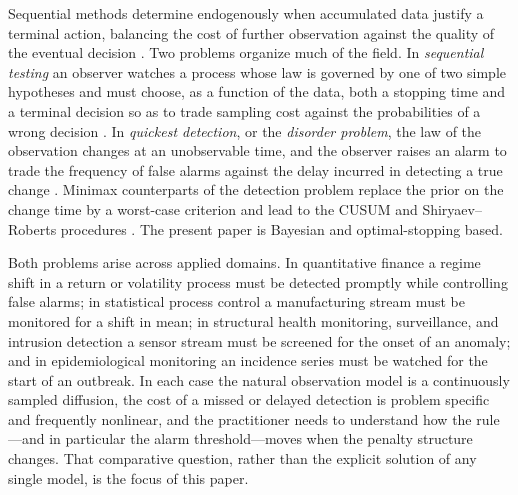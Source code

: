 \documentclass[pdflatex,sn-mathphys-num]{sn-jnl}
\theoremstyle{plain}
\theoremstyle{definition}
\begin{document}
Sequential methods determine endogenously when accumulated data justify a terminal action, balancing the cost of further observation against the quality of the eventual decision \citep{wald2004sequential,wald1948optimum,rincon2025sequential,wang2025analysis,chow1971great,griffith2021statistics,silva2020optimal,silva2015continuous,wang2025analysis1,fischer2026improving}.
Two problems organize much of the field. In \emph{sequential testing} an observer
watches a process whose law is governed by one of two simple hypotheses and must
choose, as a function of the data, both a stopping time and a terminal decision so
as to trade sampling cost against the probabilities of a wrong decision \cite{shiryaev2025optimal,pabbaraju2026simple,liu2025bidirectional}. In
\emph{quickest detection}, or the \emph{disorder problem}, the law of the
observation changes at an unobservable time, and the observer raises an alarm to
trade the frequency of false alarms against the delay incurred in detecting a true
change \citep{shiryaev1963optimum,naha2023quickest,snow2024quickest,sha2025quickest,liang2025global}. Minimax counterparts of the detection
problem replace the prior on the change time by a worst-case criterion and lead to
the CUSUM and Shiryaev--Roberts procedures
\citep{page1954continuous,banerjee2024minimax,xie2022minimax,wang2026algebraic,fromont2023minimax,yang2024sequential,huselitz2026online,lorden1971procedures,tosun2023robust,yu2024network,moustakides1986optimal,pollak1985optimal,wang2026damage,polunchenko2018comparative,pollak2009optimality}. The
present paper is Bayesian and optimal-stopping based.

Both problems arise across applied domains. In quantitative finance a regime
shift in a return or volatility process must be detected promptly while
controlling false alarms; in statistical process control a manufacturing stream
must be monitored for a shift in mean; in structural health monitoring,
surveillance, and intrusion detection a sensor stream must be screened for the
onset of an anomaly; and in epidemiological monitoring an incidence series must be
watched for the start of an outbreak. In each case the natural observation model
is a continuously sampled diffusion, the cost of a missed or delayed detection is
problem specific and frequently nonlinear, and the practitioner needs to
understand how the rule---and in particular the alarm threshold---moves when the
penalty structure changes. That comparative question, rather than the explicit
solution of any single model, is the focus of this paper.
\end{document}
